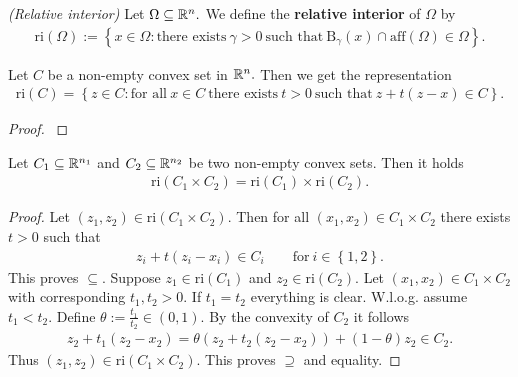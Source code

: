 \begin{definition}
  \emph{(Relative interior)}
  Let 
  $\Omega\subseteq \mathbb{R}^n.$
  We define the \textbf{relative interior} of $\Omega$ by
  \begin{gather}
    \mathrm{ri}(\Omega)
    :=
    \left\{ 
      x \in \Omega 
      \colon
      \text{there exists}\ 
      \gamma > 0\ 
      \text{such that}\ 
      \mathrm{B}_\gamma(x)
      \cap
      \mathrm{aff}(\Omega)
      \in
      \Omega
    \right\}.
  \end{gather}

\begin{proposition}
  Let $C$ be a non-empty convex set in $\mathbb{R}^n.$ Then we get the representation
  \begin{gather}
    \mathrm{ri}(C)
    =
    \left\{ 
      z \in C
      \colon
      \text{for all}\ 
      x \in C \ 
      \text{there exists}\ 
      t > 0 \ 
      \text{such that}\ 
      z + t (z-x)
      \in C
    \right\}.
  \end{gather}
\end{proposition}
\begin{proof}
  \cite[Theorem~6.4]{Rockafellar1970}
\end{proof}
\begin{proposition}
  Let $C_1\subseteq \mathbb{R}^{n_1}$ and $C_2\subseteq \mathbb{R}^{n_2}$ be two non-empty convex sets. Then it holds
  \begin{gather}
    \mathrm{ri}(C_1\times C_2)
    = 
    \mathrm{ri}(C_1)
    \times
    \mathrm{ri}(C_2).
  \end{gather}
\end{proposition}
\begin{proof}
  Let
  $
  (z_1, z_2)
  \in 
  \mathrm{ri}(C_1\times C_2).
  $
  Then for all 
  $
  (x_1, x_2)
  \in 
  C_1\times C_2
  $
  there exists
  $t>0$
  such that
  \begin{gather}
      z_i + t (z_i-x_i)
      \in C_i
      \qquad
      \text{for}\ 
      i\in \left\{ 1,2 \right\}.
  \end{gather}
  This proves $\subseteq.$
  Suppose 
  $
    z_1 
    \in
    \mathrm{ri}(C_1)
  $
  and
  $
    z_2 
    \in
    \mathrm{ri}(C_2).
  $
  Let
  $
    (x_1,x_2)\in C_1\times C_2
  $
  with corresponding $t_1,t_2 >0$.
  If $t_1=t_2$ everything is clear.
  W.l.o.g.
  assume 
  $t_1<t_2$. Define $\theta:=\frac{t_1}{t_2}\in (0,1).$
  By the convexity of $C_2$ it follows
  \begin{gather}
    z_2 + t_1 (z_2 - x_2)
    =
    \theta
    (
    z_2 + t_2 (z_2 - x_2)
    )
    +
    (1-\theta)z_2
    \in C_2.
  \end{gather}
  Thus
  $
  (z_1,z_2)\in\mathrm{ri}(C_1\times C_2). 
  $
  This proves $\supseteq$ and equality.
\end{proof}
 

\end{definition}
